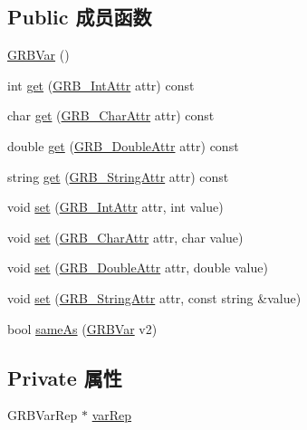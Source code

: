 \subsection*{Public 成员函数}
\begin{DoxyCompactItemize}
\item 
\hyperlink{classGRBVar_ada09a21b1a10eb3d0850742a814bdcbe}{G\+R\+B\+Var} ()
\item 
int \hyperlink{classGRBVar_ae4f7bcb2f1566f8cbecc68f2c91b9fd3}{get} (\hyperlink{gurobi__c_09_09_8h_acfc136f6822be3d3e36ac84bd76b0900}{G\+R\+B\+\_\+\+Int\+Attr} attr) const 
\item 
char \hyperlink{classGRBVar_ad5f125a3d1f68da54c502027b7a6aa70}{get} (\hyperlink{gurobi__c_09_09_8h_a590e6aa44289cb0563eb6a382794dace}{G\+R\+B\+\_\+\+Char\+Attr} attr) const 
\item 
double \hyperlink{classGRBVar_a3cd63f30eba419c1cc32adf5f9a2b3c1}{get} (\hyperlink{gurobi__c_09_09_8h_a2f43cc28447ce1778973a1f7961e8180}{G\+R\+B\+\_\+\+Double\+Attr} attr) const 
\item 
string \hyperlink{classGRBVar_a394688ebea6147535c0c1977c4153bb1}{get} (\hyperlink{gurobi__c_09_09_8h_a08ffa110d9b1684d689ae53300bb7ec1}{G\+R\+B\+\_\+\+String\+Attr} attr) const 
\item 
void \hyperlink{classGRBVar_ad87e786374280a1eff2e80b9bab70e34}{set} (\hyperlink{gurobi__c_09_09_8h_acfc136f6822be3d3e36ac84bd76b0900}{G\+R\+B\+\_\+\+Int\+Attr} attr, int value)
\item 
void \hyperlink{classGRBVar_a27bf9e5723cfc4db029a49ac7e75737a}{set} (\hyperlink{gurobi__c_09_09_8h_a590e6aa44289cb0563eb6a382794dace}{G\+R\+B\+\_\+\+Char\+Attr} attr, char value)
\item 
void \hyperlink{classGRBVar_a86c84b7441910761ba0c65981a95a5af}{set} (\hyperlink{gurobi__c_09_09_8h_a2f43cc28447ce1778973a1f7961e8180}{G\+R\+B\+\_\+\+Double\+Attr} attr, double value)
\item 
void \hyperlink{classGRBVar_a8464c6f92033960cf7a988633dadc38f}{set} (\hyperlink{gurobi__c_09_09_8h_a08ffa110d9b1684d689ae53300bb7ec1}{G\+R\+B\+\_\+\+String\+Attr} attr, const string \&value)
\item 
bool \hyperlink{classGRBVar_a3fa6da896d85d67cfcec9179e74e233a}{same\+As} (\hyperlink{classGRBVar}{G\+R\+B\+Var} v2)
\end{DoxyCompactItemize}
\subsection*{Private 属性}
\begin{DoxyCompactItemize}
\item 
G\+R\+B\+Var\+Rep $\ast$ \hyperlink{classGRBVar_a365c4e6fdc26fb055c9db636eff617e3}{var\+Rep}
\end{DoxyCompactItemize}
